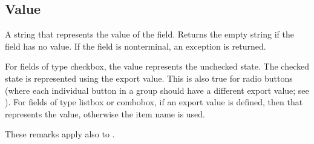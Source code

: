 \documentclass[letterpaper,12pt,english,openany,oneside]{sphinxmanual}
\begin{document}
\begin{sphinxVerbatim}[commandchars=\\\{\}]
\PYG{p}{[}\PYG{p}{]} 
\end{sphinxVerbatim}
\label{\detokenize{IAC_API_FormsIntro:example-20}}

\begin{sphinxVerbatim}[commandchars=\\\{\}]
   
 
 
\end{sphinxVerbatim}




\subsection{Value}
\label{\detokenize{IAC_API_FormsIntro:value}}
A string that represents the value of the field.  Returns  the empty string if the field has no value. If the field is non\sphinxhyphen{}terminal, an exception  is returned.

For fields of type checkbox, the value  represents the unchecked state. The checked state is represented using the export value. This is also true for radio buttons (where each individual button in a group should have a different export value; see ). For fields of type listbox or combobox, if an export value is defined, then that represents the value, otherwise the item name is used.

These remarks apply also to .

\label{\detokenize{IAC_API_FormsIntro:syntax-32}}

\begin{sphinxVerbatim}[commandchars=\\\{\}]
\PYG{p}{[}\PYG{p}{]} 
\end{sphinxVerbatim}
\label{\detokenize{IAC_API_FormsIntro:example-21}}
\end{document}
